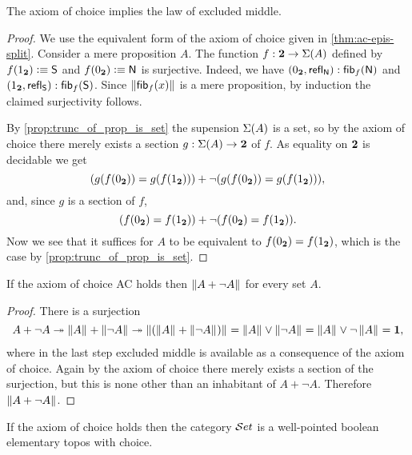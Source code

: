 \begin{thm}[Diaconescu]\label{thm:1surj_to_surj_to_pem}
  The axiom of choice implies the law of excluded middle.
\end{thm}

\begin{proof}
We use the equivalent form of the axiom of choice given in \autoref{thm:ac-epis-split}.
Consider a mere proposition $A$.
The function $f:\mathbf{2}\to\Sigma(A)$ defined by
$f({1_{\mathbf{2}}}) \vcentcolon\equiv \mathsf{S}$ and $f({0_{\mathbf{2}}}) \vcentcolon\equiv \mathsf{N}$
is surjective.
Indeed, we have
${({0_{\mathbf{2}}},\mathsf{refl}_{\mathsf{N}})} : {\mathsf{fib}}_{f}(\mathsf{N})$
and ${({1_{\mathbf{2}}},\mathsf{refl}_{\mathsf{S}})} :{\mathsf{fib}}_{f}(\mathsf{S})$.
Since $\left\Vert {\mathsf{fib}}_{f}(x)\right\Vert_{}$ is a mere proposition, by induction the claimed surjectivity follows.

By \autoref{prop:trunc_of_prop_is_set} the supension $\Sigma(A)$
is a set, so by the axiom of choice there merely exists a
section $g: \Sigma(A) \to \mathbf{2}$ of $f$.
As equality on $\mathbf{2}$ is decidable we get
\begin{equation*}
 (g(f({0_{\mathbf{2}}}))= g(f({1_{\mathbf{2}}}))) +
 \lnot (g(f({0_{\mathbf{2}}}))= g(f({1_{\mathbf{2}}}))),
\end{equation*}
and, since $g$ is a section of $f$,
\begin{equation*}
(f({0_{\mathbf{2}}}) = f({1_{\mathbf{2}}})) +
\lnot (f({0_{\mathbf{2}}}) = f({1_{\mathbf{2}}})).
\end{equation*}
Now we see that it suffices for $A$ to be equivalent to
$f({0_{\mathbf{2}}}) = f({1_{\mathbf{2}}})$, which is the case by \autoref{prop:trunc_of_prop_is_set}.
\end{proof}

\begin{cor}\label{cor:ACtoLEM0}
  If the axiom of choice AC holds then $\left\Vert A + \neg A\right\Vert_{}$ for every set $A$.
\end{cor}

\begin{proof}
  There is a surjection
  \[
  A + \neg A \twoheadrightarrow \left\Vert A\right\Vert_{} + \left\Vert \neg A\right\Vert_{} \twoheadrightarrow
  \left\Vert (\left\Vert A\right\Vert_{} + \left\Vert \neg A\right\Vert_{})\right\Vert_{} = \left\Vert A\right\Vert_{} \vee \left\Vert \neg A\right\Vert_{} = \left\Vert A\right\Vert_{} \vee \neg \left\Vert A\right\Vert_{} = \mathbf{1},
  \]
  where in the last step excluded middle is available as a consequence of the axiom of choice.
  Again by the axiom of choice there merely exists a section of the surjection, but this
  is none other than an inhabitant of $A + \neg A$. Therefore $\left\Vert A+\neg A\right\Vert_{}$.
\end{proof}

\begin{thm}\label{thm:ETCS}
  If the axiom of choice holds then the category $\mathcal{S}et$ is a well-pointed boolean elementary topos with choice.  
\end{thm}


